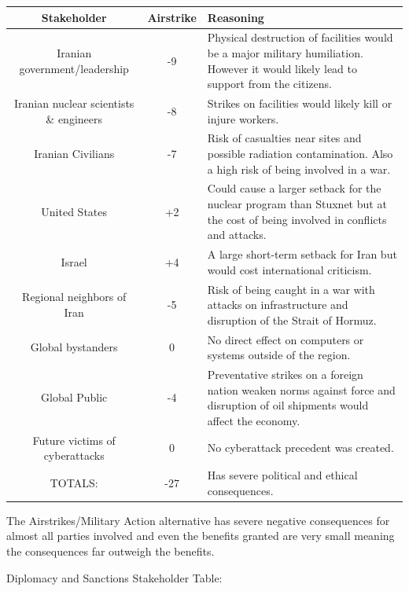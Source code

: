 \begin{table}[h]
\centering
\begin{tabular}{|c|c|p{8cm}|}
\hline
Stakeholder & Airstrike & Reasoning \\ \hline
Iranian government/leadership & -9 & Physical destruction of facilities would be a major military humiliation. However it would likely lead to support from the citizens. \\ \hline
Iranian nuclear scientists \& engineers & -8 & Strikes on facilities would likely kill or injure workers. \\ \hline
Iranian Civilians & -7 & Risk of casualties near sites and possible radiation contamination. Also a high risk of being involved in a war. \\ \hline
United States & +2 & Could cause a larger setback for the nuclear program than Stuxnet but at the cost of being involved in conflicts and attacks. \\ \hline
Israel & +4 & A large short-term setback for Iran but would cost international criticism. \\ \hline
Regional neighbors of Iran & -5 & Risk of being caught in a war with attacks on infrastructure and disruption of the Strait of Hormuz. \\ \hline
Global bystanders & 0 & No direct effect on computers or systems outside of the region. \\ \hline
Global Public & -4 & Preventative strikes on a foreign nation weaken norms against force and disruption of oil shipments would affect the economy. \\ \hline
Future victims of cyberattacks & 0 & No cyberattack precedent was created. \\ \hline
TOTALS: & -27 & Has severe political and ethical consequences. \\ \hline
\end{tabular}
\end{table}

The Airstrikes/Military Action alternative has severe negative consequences for almost all parties involved and even the benefits granted are very small meaning the consequences far outweigh the benefits.

Diplomacy and Sanctions Stakeholder Table:

